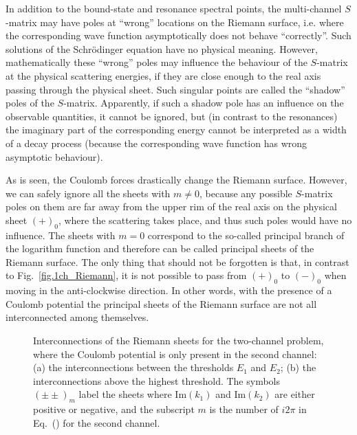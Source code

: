 \documentclass[12pt]{article}
\begin{document}
In addition to the bound-state and resonance spectral points, the multi-channel 
$S$-matrix may have poles at ``wrong'' locations on the Riemann surface, i.e. 
where the corresponding wave function asymptotically does not behave 
``correctly''. Such solutions of the Schr\"odinger equation have no physical 
meaning. However, mathematically these ``wrong'' poles may influence the 
behaviour of the $S$-matrix at the physical scattering energies, if they are 
close enough to the real axis passing through the physical sheet. Such singular 
points are called the ``shadow'' poles of the $S$-matrix. Apparently, if such a 
shadow pole has an influence on the observable quantities, it cannot be ignored, 
but (in contrast to the resonances) the imaginary part of the corresponding 
energy cannot be interpreted as a width of a decay process (because the 
corresponding wave function has wrong asymptotic behaviour).

As is seen, the Coulomb forces drastically change the Riemann surface. However,
we can safely ignore all the sheets with $m\neq0$, because any possible
$S$-matrix poles on them are far away from the upper rim of the real axis on
the physical sheet $(+)_0$, where the scattering takes place, and thus such
poles would have no influence. The sheets with $m=0$ correspond to the
so-called principal branch of the logarithm function and therefore can be called
principal sheets of the Riemann surface. The only thing that should not be
forgotten is that, in contrast to Fig.~\ref{fig.1ch_Riemann}, it is not possible
to pass from $(+)_0$ to $(-)_0$ when moving in the anti-clockwise direction. In
other words, with the presence of a Coulomb potential the principal sheets
of the Riemann surface are not all interconnected among themselves.

\begin{figure}
\centerline{}
\caption{\sf
Interconnections of the Riemann sheets for the two-channel problem, where the
Coulomb potential is only present in the second channel:
(a) the interconnections between the thresholds $E_1$ and $E_2$; (b) the
interconnections above the highest threshold. The symbols
$(\pm\pm)_m$ label the sheets where $\mathrm{Im}(k_1)$ and $\mathrm{Im}(k_2)$
are either positive or
negative, and the subscript $m$ is the number of $i2\pi$ in
Eq.~(\protect{\ref{Logarithm_ch_momenta}}) for the second channel.
}
\label{fig.sheets_2ch_Coulomb}
\end{figure}
\end{document}
